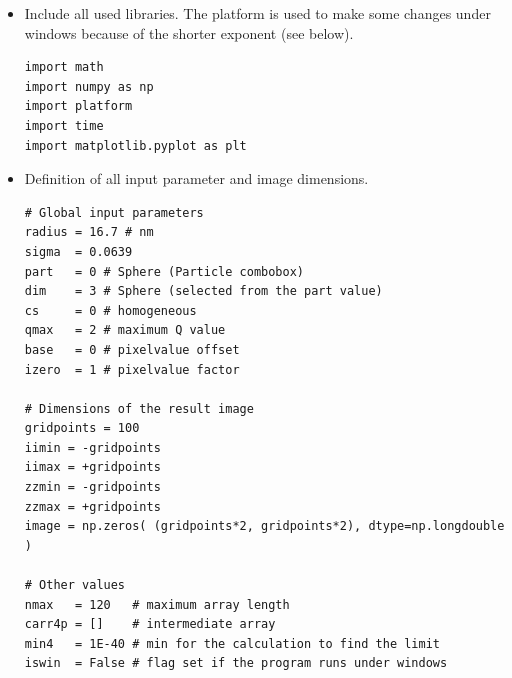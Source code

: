 \documentclass[11pt]{article} %
\begin{document}
\begin{itemize}
\item Include all used libraries. The platform is used to make some changes under windows because of the shorter exponent (see below).
\begin{lstlisting}[frame=single]
import math
import numpy as np
import platform
import time
import matplotlib.pyplot as plt
\end{lstlisting}

\item Definition of all input parameter and image dimensions.
\begin{lstlisting}[frame=single]
# Global input parameters
radius = 16.7 # nm
sigma  = 0.0639
part   = 0 # Sphere (Particle combobox)
dim    = 3 # Sphere (selected from the part value)
cs     = 0 # homogeneous
qmax   = 2 # maximum Q value
base   = 0 # pixelvalue offset
izero  = 1 # pixelvalue factor

# Dimensions of the result image
gridpoints = 100
iimin = -gridpoints
iimax = +gridpoints
zzmin = -gridpoints
zzmax = +gridpoints
image = np.zeros( (gridpoints*2, gridpoints*2), dtype=np.longdouble )

# Other values
nmax   = 120   # maximum array length
carr4p = []    # intermediate array
min4   = 1E-40 # min for the calculation to find the limit
iswin  = False # flag set if the program runs under windows
\end{lstlisting}


\end{itemize}
\end{document}
